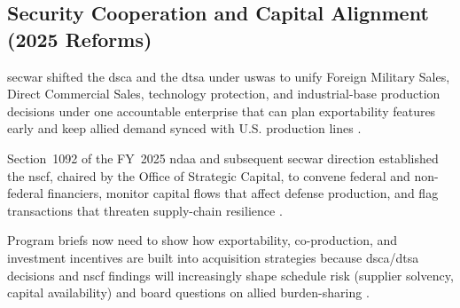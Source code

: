 \documentclass[../main.tex]{subfiles}
\begin{document}
\subsection{Security Cooperation and Capital Alignment (2025 Reforms)}
\begin{description}[style=nextline,labelsep=0.5em,font=\bfseries]
  \item[\textbf{Arms-transfer realignment.}] \ac{secwar} shifted the \ac{dsca} and the \ac{dtsa} under \ac{uswas} to unify Foreign Military Sales, Direct Commercial Sales, technology protection, and industrial-base production decisions under one accountable enterprise that can plan exportability features early and keep allied demand synced with U.S. production lines \autocite{secwar-arms-transfer-2025}.
  \item[\textbf{National Security Capital Forum.}] Section~1092 of the FY~2025 \ac{ndaa} and subsequent \ac{secwar} direction established the \ac{nscf}, chaired by the Office of Strategic Capital, to convene federal and non-federal financiers, monitor capital flows that affect defense production, and flag transactions that threaten supply-chain resilience \autocite{secwar-nscf-2025}.
  \item[\textbf{EDO relevance.}] Program briefs now need to show how exportability, co-production, and investment incentives are built into acquisition strategies because \ac{dsca}/\ac{dtsa} decisions and \ac{nscf} findings will increasingly shape schedule risk (supplier solvency, capital availability) and board questions on allied burden-sharing \autocite{secwar-arms-transfer-2025,secwar-nscf-2025}.
\end{description}
\end{document}
